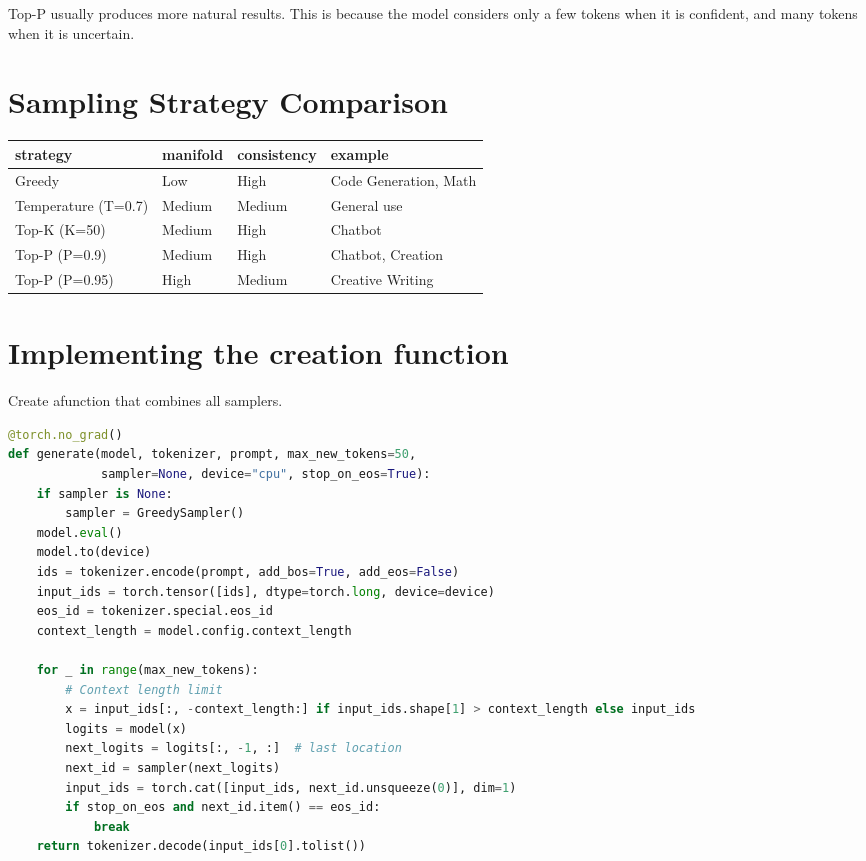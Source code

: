 Top-P usually produces more natural results. This is because the model considers only a few tokens when it is confident, and many tokens when it is uncertain.

\section{Sampling Strategy Comparison}

\begin{center}
\begin{tabularx}{\textwidth}{lXXX}
\toprule
\textbf{strategy}&\textbf{manifold}&\textbf{consistency}&\textbf{example}\\
\midrule
Greedy & Low & High & Code Generation, Math \\
Temperature (T=0.7) & Medium & Medium & General use \\
Top-K (K=50) & Medium & High & Chatbot \\
Top-P (P=0.9) & Medium & High & Chatbot, Creation \\
Top-P (P=0.95) & High & Medium & Creative Writing \\
\bottomrule
\end{tabularx}
\end{center}

\section{Implementing the creation function}

Create afunction that combines all samplers.

\begin{lstlisting}[language=Python]
@torch.no_grad()
def generate(model, tokenizer, prompt, max_new_tokens=50,
             sampler=None, device="cpu", stop_on_eos=True):
    if sampler is None:
        sampler = GreedySampler()
    model.eval()
    model.to(device)
    ids = tokenizer.encode(prompt, add_bos=True, add_eos=False)
    input_ids = torch.tensor([ids], dtype=torch.long, device=device)
    eos_id = tokenizer.special.eos_id
    context_length = model.config.context_length

    for _ in range(max_new_tokens):
        # Context length limit
        x = input_ids[:, -context_length:] if input_ids.shape[1] > context_length else input_ids
        logits = model(x)
        next_logits = logits[:, -1, :]  # last location
        next_id = sampler(next_logits)
        input_ids = torch.cat([input_ids, next_id.unsqueeze(0)], dim=1)
        if stop_on_eos and next_id.item() == eos_id:
            break
    return tokenizer.decode(input_ids[0].tolist())
\end{lstlisting}

